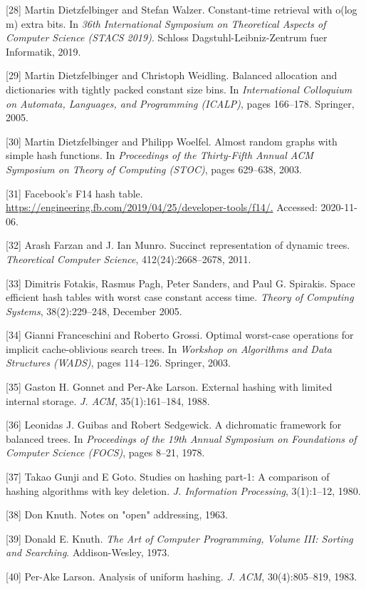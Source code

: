 \documentclass[12pt,a4paper]{ctexart}
\theoremstyle{remark}
\begin{document}
[28] Martin Dietzfelbinger and Stefan Walzer. Constant-time retrieval with o(log m) extra bits. In \textit{36th International Symposium on Theoretical Aspects of Computer Science (STACS 2019)}. Schloss Dagstuhl-Leibniz-Zentrum fuer Informatik, 2019.

[29] Martin Dietzfelbinger and Christoph Weidling. Balanced allocation and dictionaries with tightly packed constant size bins. In \textit{International Colloquium on Automata, Languages, and Programming (ICALP)}, pages 166--178. Springer, 2005.

[30] Martin Dietzfelbinger and Philipp Woelfel. Almost random graphs with simple hash functions. In \textit{Proceedings of the Thirty-Fifth Annual ACM Symposium on Theory of Computing (STOC)}, pages 629--638, 2003.

[31] Facebook's F14 hash table. \url{https://engineering.fb.com/2019/04/25/developer-tools/f14/.} Accessed: 2020-11-06.

[32] Arash Farzan and J. Ian Munro. Succinct representation of dynamic trees. \textit{Theoretical Computer Science}, 412(24):2668--2678, 2011.

[33] Dimitris Fotakis, Rasmus Pagh, Peter Sanders, and Paul G. Spirakis. Space efficient hash tables with worst case constant access time. \textit{Theory of Computing Systems}, 38(2):229--248, December 2005.

[34] Gianni Franceschini and Roberto Grossi. Optimal worst-case operations for implicit cache-oblivious search trees. In \textit{Workshop on Algorithms and Data Structures (WADS)}, pages 114--126. Springer, 2003.

[35] Gaston H. Gonnet and Per-Ake Larson. External hashing with limited internal storage. \textit{J. ACM}, 35(1):161--184, 1988.

[36] Leonidas J. Guibas and Robert Sedgewick. A dichromatic framework for balanced trees. In \textit{Proceedings of the 19th Annual Symposium on Foundations of Computer Science (FOCS)}, pages 8--21, 1978.

[37] Takao Gunji and E Goto. Studies on hashing part-1: A comparison of hashing algorithms with key deletion. \textit{J. Information Processing}, 3(1):1--12, 1980.

[38] Don Knuth. Notes on "open" addressing, 1963.

[39] Donald E. Knuth. \textit{The Art of Computer Programming, Volume III: Sorting and Searching}. Addison-Wesley, 1973.

[40] Per-Ake Larson. Analysis of uniform hashing. \textit{J. ACM}, 30(4):805--819, 1983.
\end{document}
